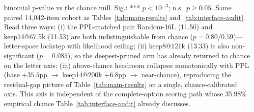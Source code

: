 \begin{table}[!t]
{binomial p-value vs the chance null. Sig.: *** $p{<}10^{-3}$; n.s.\ $p{\geq}0.05$.
Same paired 14{,}042-item cohort as Tables~\ref{tab:main-results}
and~\ref{tab:interface-audit}. Read three ways: (i) the PPL-matched pair Random-16L
(11.50) and keep14@67.5k (11.53) are both indistinguishable from chance
($p{=}0.80/0.59$)---letter-space lockstep with likelihood ceiling; (ii) keep8@121k
(13.33) is also non-significant ($p{=}0.085$), so the deepest-pruned arm has
already returned to chance on the letter axis; (iii) above-chance headroom
collapses monotonically with PPL (base $+35.5$pp $\to$ keep14@200k $+6.8$pp
$\to$ near-chance), reproducing the residual-gap picture of
Table~\ref{tab:main-results} on a single, chance-calibrated axis. This axis is
independent of the complete-option scoring path whose 35.98\% empirical chance
Table~\ref{tab:interface-audit} already discusses.}
\label{tab:letter-headroom}
\end{table}
